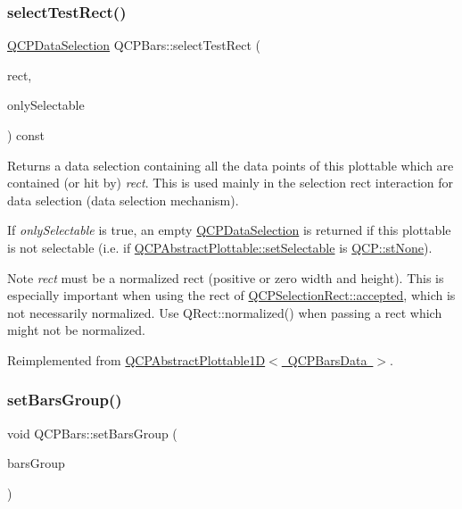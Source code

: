\subsubsection{\texorpdfstring{selectTestRect()}{selectTestRect()}}
{\footnotesize\ttfamily \mbox{\hyperlink{class_q_c_p_data_selection}{Q\+C\+P\+Data\+Selection}} Q\+C\+P\+Bars\+::select\+Test\+Rect (\begin{DoxyParamCaption}\item[{const Q\+RectF \&}]{rect,  }\item[{bool}]{only\+Selectable }\end{DoxyParamCaption}) const\hspace{0.3cm}{\ttfamily [virtual]}}





Returns a data selection containing all the data points of this plottable which are contained (or hit by) {\itshape rect}. This is used mainly in the selection rect interaction for data selection (data selection mechanism).

If {\itshape only\+Selectable} is true, an empty \mbox{\hyperlink{class_q_c_p_data_selection}{Q\+C\+P\+Data\+Selection}} is returned if this plottable is not selectable (i.\+e. if \mbox{\hyperlink{class_q_c_p_abstract_plottable_ac238d6e910f976f1f30d41c2bca44ac3}{Q\+C\+P\+Abstract\+Plottable\+::set\+Selectable}} is \mbox{\hyperlink{namespace_q_c_p_ac6cb9db26a564b27feda362a438db038aa64628e338a2dd1e6f0dc84dec0b63fe}{Q\+C\+P\+::st\+None}}).

\begin{DoxyNote}{Note}
{\itshape rect} must be a normalized rect (positive or zero width and height). This is especially important when using the rect of \mbox{\hyperlink{class_q_c_p_selection_rect_a15a43542e1f7b953a44c260b419e6d2c}{Q\+C\+P\+Selection\+Rect\+::accepted}}, which is not necessarily normalized. Use {\ttfamily Q\+Rect\+::normalized()} when passing a rect which might not be normalized. 
\end{DoxyNote}


Reimplemented from \mbox{\hyperlink{class_q_c_p_abstract_plottable1_d_a22377bf6e57ab7eedbc9e489250c6ded}{Q\+C\+P\+Abstract\+Plottable1\+D$<$ Q\+C\+P\+Bars\+Data $>$}}.

\mbox{\label{class_q_c_p_bars_aedd1709061f0b307c47ddb45e172ef9a}} 
\subsubsection{\texorpdfstring{setBarsGroup()}{setBarsGroup()}}
{\footnotesize\ttfamily void Q\+C\+P\+Bars\+::set\+Bars\+Group (\begin{DoxyParamCaption}\item[{\mbox{\hyperlink{class_q_c_p_bars_group}{Q\+C\+P\+Bars\+Group}} $\ast$}]{bars\+Group }\end{DoxyParamCaption})}

